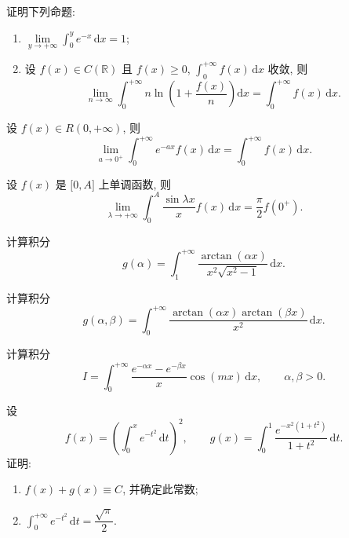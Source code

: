 \documentclass[../数学分析培优讲义.tex]{subfiles}
\begin{document}
\begin{example}
证明下列命题:
\begin{enumerate}[label=(\arabic*)]
    \item $\displaystyle \lim\limits_{y\to+\infty}\int_0^y e^{-x}\,\mathrm{d}x=1$;
    \item 设 $f(x)\in C(\mathbb{R})$ 且 $f(x)\geq0$, $\displaystyle\int_0^{+\infty}f(x)\,\mathrm{d}x$ 收敛, 则
    \[
        \lim\limits_{n\to\infty}\int_0^{+\infty}n\ln\left(1+\dfrac{f(x)}{n}\right)\mathrm{d}x
        =\int_0^{+\infty}f(x)\,\mathrm{d}x.
    \]
\end{enumerate}
\end{example}
\exampleblank

\begin{example}
设 $f(x)\in R(0,+\infty)$, 则
\[
    \lim\limits_{a\to0^+}\int_0^{+\infty}e^{-ax}f(x)\,\mathrm{d}x
    =\int_0^{+\infty}f(x)\,\mathrm{d}x.
\]
\end{example}
\exampleblank

\begin{example}[\markstar]
设 $f(x)$ 是 $\lbrack0,A\rbrack$ 上单调函数, 则
\[
    \lim\limits_{\lambda\to+\infty}\int_0^A\dfrac{\sin\lambda x}{x}f(x)\,\mathrm{d}x
    =\dfrac{\pi}{2}f(0^+).
\]
\end{example}
\exampleblank

\begin{example}
计算积分
\[
    g(\alpha)=\int_1^{+\infty}\dfrac{\arctan(\alpha x)}{x^2\sqrt{x^2-1}}\,\mathrm{d}x.
\]
\end{example}
\exampleblank

\begin{example}
计算积分
\[
    g(\alpha,\beta)=\int_0^{+\infty}\dfrac{\arctan(\alpha x)\arctan(\beta x)}{x^2}\,\mathrm{d}x.
\]
\end{example}
\exampleblank

\begin{example}
计算积分
\[
    I=\int_0^{+\infty}\dfrac{e^{-\alpha x}-e^{-\beta x}}{x}\cos(mx)\,\mathrm{d}x,
    \qquad \alpha,\beta>0.
\]
\end{example}
\exampleblank

\begin{example}
设
\[
    f(x)=\left(\int_0^x e^{-t^2}\,\mathrm{d}t\right)^2,
    \qquad
    g(x)=\int_0^1\dfrac{e^{-x^2(1+t^2)}}{1+t^2}\,\mathrm{d}t.
\]
证明:
\begin{enumerate}[label=(\arabic*)]
    \item $f(x)+g(x)\equiv C$, 并确定此常数;
    \item $\displaystyle\int_0^{+\infty}e^{-t^2}\,\mathrm{d}t=\dfrac{\sqrt{\pi}}{2}$.
\end{enumerate}
\end{example}
\exampleblank
\end{document}
